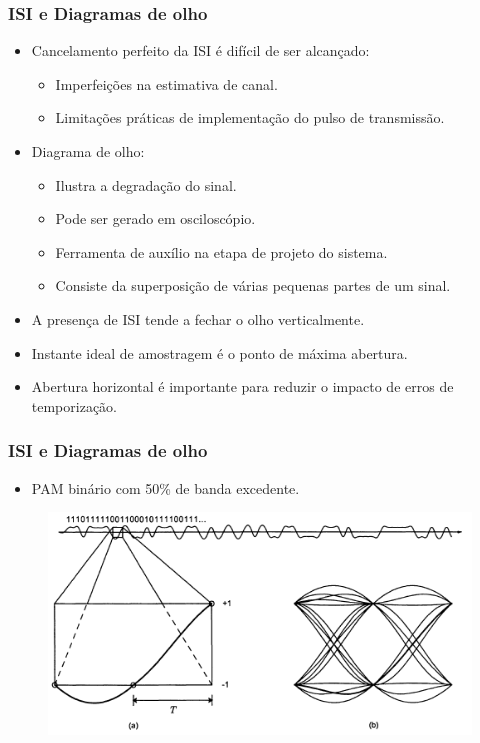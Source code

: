 \begin{frame}
	\frametitle{ISI e Diagramas de olho}

	\begin{itemize}
	    \item Cancelamento perfeito da ISI é difícil de ser alcançado:
	    \begin{itemize}
		\item Imperfeições na estimativa de canal.
		\item Limitações práticas de implementação do pulso de transmissão.
	    \end{itemize}
	    \item Diagrama de olho:
	    \begin{itemize}
		\item Ilustra a degradação do sinal.
		\item Pode ser gerado em osciloscópio.
		\item Ferramenta de auxílio na etapa de projeto do sistema.
		\item Consiste da superposição de várias pequenas partes de um sinal.
	    \end{itemize}
	    \item A presença de ISI tende a fechar o olho verticalmente.
	    \item Instante ideal de amostragem é o ponto de máxima abertura.
	    \item Abertura horizontal é importante para reduzir o impacto de erros de temporização.
	\end{itemize}		
\end{frame}

\begin{frame}
	\frametitle{ISI e Diagramas de olho}

	\begin{itemize}
	 \item PAM binário com 50\% de banda excedente.
	\end{itemize}	
	\begin{figure}[t]	
	  \begin{center}
	    \includegraphics[width=0.9\columnwidth]{figs/pam_10}
	  \end{center}
	\end{figure}
\end{frame}

